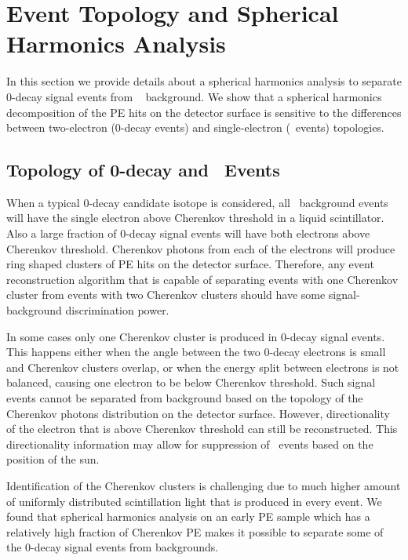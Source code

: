 \section{Event Topology and Spherical Harmonics Analysis}
\label{sec:topology_and_harmonics}

In this section we provide details about a spherical harmonics analysis to separate 0\nbb-decay signal events from \B~ background. 
We show that a spherical harmonics decomposition of the PE hits on the detector surface is sensitive to the differences between 
two-electron (0\nbb-decay events) and single-electron (\B~events) topologies.


\subsection{Topology of 0\nbb-decay and \B~Events}
\label{subsec:topology}

When a typical 0\nbb-decay candidate isotope is considered, all \B~background events will have the single electron above Cherenkov threshold
in a liquid scintillator. Also a large fraction of 0\nbb-decay signal events will have both electrons above Cherenkov threshold. Cherenkov photons
from each of the electrons will produce ring shaped clusters of PE hits on the detector surface. Therefore, any event reconstruction algorithm 
that is capable of separating events with one Cherenkov cluster from events with two Cherenkov clusters should have some signal-background 
discrimination power. 

In some cases only one Cherenkov cluster is produced in 0\nbb-decay signal events. This happens either when the angle between the two 
0\nbb-decay electrons is small and Cherenkov clusters overlap, or when the energy split between electrons is not balanced, causing 
one electron to be below Cherenkov threshold.
Such signal events cannot be separated from background based on the topology of the Cherenkov photons distribution on the detector surface. 
However, directionality of the electron that is above Cherenkov threshold can still be reconstructed. This directionality information 
may allow for suppression of \B~events based on the position of the sun.

Identification of the Cherenkov clusters is challenging due to much higher amount of uniformly distributed scintillation light that is
produced in every event. We found that spherical harmonics analysis on an early PE sample which has a relatively high fraction of 
Cherenkov PE makes it possible to separate some of the 0\nbb-decay signal events from backgrounds.

